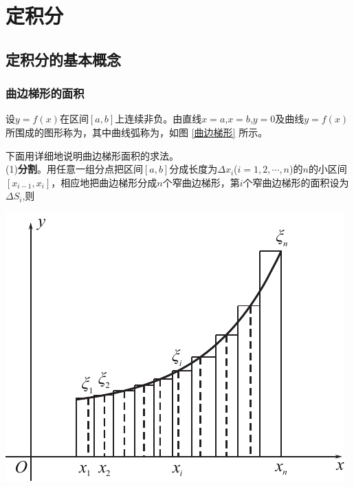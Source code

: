 \chapter{定积分}
\thispagestyle{empty}
\noindent
\begin{minipage}{0.55\linewidth}
	\section{定积分的基本概念}
	\subsection{曲边梯形的面积}
\hspace*{2em} 设$y=f(x)$在区间$[a,b]$上连续非负。由直线$x=a$,$x=b$,$y=0$及曲线$y=f(x)$所围成的图形称为，其中曲线弧称为，如图 \ref{曲边梯形} 所示。

\hspace*{2em} 下面用详细地说明曲边梯形面积的求法。\\
\hspace*{2em} (1)\enspace\textbf{分割}。用任意一组分点把区间$[a,b]$分成长度为$\Delta x_i$($i=1,2,\cdots,n$)的$n$的小区间$[x_{i-1},x_i]$，相应地把曲边梯形分成$n$个窄曲边梯形，第$i$个窄曲边梯形的面积设为$\Delta S_i$,则
\end{minipage}
\begin{minipage}{0.45\linewidth}
	\centering
	\includegraphics[width = 0.95\linewidth]{pic/C-4/曲边梯形}
	\vspace*{-1em}
	\label{曲边梯形}
\end{minipage}

